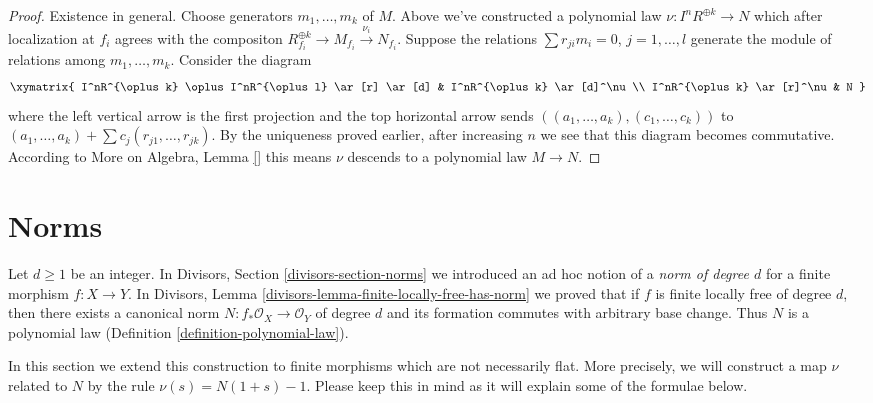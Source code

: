 \begin{proof}
\medskip\noindent
Existence in general. Choose generators $m_1, \ldots, m_k$ of $M$.
Above we've constructed a polynomial law $\nu : I^nR^{\oplus k} \to N$
which after localization at $f_i$ agrees with the compositon
$R_{f_i}^{\oplus k} \to M_{f_i} \xrightarrow{\nu_i} N_{f_i}$.
Suppose the relations $\sum r_{ji} m_i = 0$, $j = 1, \ldots, l$
generate the module of relations among $m_1, \ldots, m_k$.
Consider the diagram
$$
\xymatrix{
I^nR^{\oplus k} \oplus I^nR^{\oplus l} \ar[r] \ar[d] &
I^nR^{\oplus k} \ar[d]^\nu \\
I^nR^{\oplus k} \ar[r]^\nu &
N
}
$$
where the left vertical arrow is the first projection and the
top horizontal arrow sends $((a_1, \ldots, a_k), (c_1, \ldots, c_k))$ to
$(a_1, \ldots, a_k) + \sum c_j(r_{j1}, \ldots, r_{jk})$.
By the uniqueness proved earlier, after increasing $n$
we see that this diagram becomes commutative.
According to More on Algebra, Lemma \ref{} this
means $\nu$ descends to a polynomial law $M \to N$.
\end{proof}







\section{Norms}
\label{section-norms}

\noindent
Let $d \geq 1$ be an integer. In Divisors, Section \ref{divisors-section-norms}
we introduced an ad hoc notion of a {\it norm of degree $d$} for a finite
morphism $f : X \to Y$. In
Divisors, Lemma \ref{divisors-lemma-finite-locally-free-has-norm}
we proved that if $f$ is finite locally free of degree $d$,
then there exists a canonical norm $N : f_*\mathcal{O}_X \to \mathcal{O}_Y$
of degree $d$ and its formation commutes with arbitrary base change.
Thus $N$ is a polynomial law (Definition \ref{definition-polynomial-law}).

\medskip\noindent
In this section we extend this construction to finite morphisms
which are not necessarily flat. More precisely, we will construct
a map $\nu$ related to $N$ by the rule $\nu(s) = N(1 + s) - 1$.
Please keep this in mind as it will explain some of the formulae
below.

